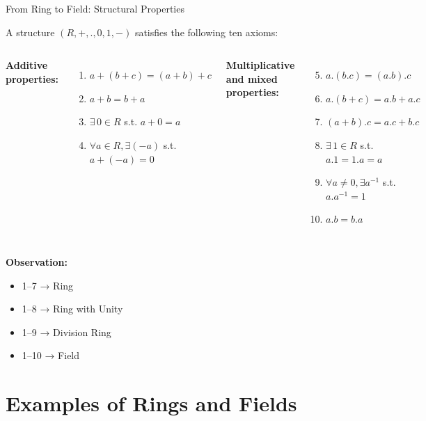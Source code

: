 \documentclass[11pt,aspectratio=43,ignorenonframetext,t]{beamer}
\begin{document}
\begin{frame}{From Ring to Field: Structural Properties}
\vspace{-0.5cm}
\begin{block}{}
    A structure $(R,+,.,0,1,-)$ satisfies the following ten axioms:

\begin{columns}[t]
\textbf{Additive properties:}
\begin{enumerate}
\item $a+(b+c)=(a+b)+c$
\item $a+b=b+a$
\item $\exists\,0\in R$ s.t. $a+0=a$
\item $\forall a\in R, \exists (-a)$ s.t. $a+(-a)=0$
\end{enumerate}

\textbf{Multiplicative and mixed properties:}
\begin{enumerate}
\setcounter{enumi}{4}
\item $a.(b.c)=(a.b).c$
\item $a.(b+c)=a.b+a.c$
\item $(a+b).c=a.c+b.c$
\item $\exists\,1\in R$ s.t. $a.1=1.a=a$
\item $\forall a\neq0, \exists a^{-1}$ s.t. $a.a^{-1}=1$
\item $a.b=b.a$
\end{enumerate}
\end{columns}
\vspace{-0.7cm}
\textbf{Observation:}
\begin{itemize}
  \item 1–7 → Ring
  \item 1–8 → Ring with Unity
  \item 1–9 → Division Ring
  \item 1–10 → Field
\end{itemize}
\end{block}
\end{frame}

\section{Examples of Rings and Fields}
\end{document}
